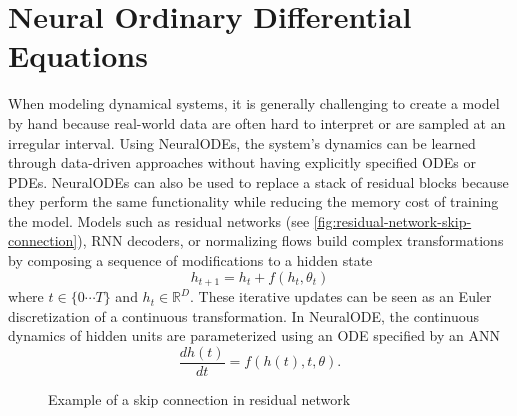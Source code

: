 \section{Neural Ordinary Differential Equations}
\label{sec:literature-review-neural-ordinary-differential-equations}

When modeling dynamical systems, it is generally challenging to create a model by hand because real-world data are often hard to interpret or are sampled at an irregular interval.
Using \glspl{NeuralODE}, the system's dynamics can be learned through data-driven approaches without having explicitly specified \glspl{ODE} or \glspl{PDE}.
\glspl{NeuralODE} can also be used to replace a stack of residual blocks because they perform the same functionality while reducing the memory cost of training the model.
Models such as residual networks (see \autoref{fig:residual-network-skip-connection}), \gls{RNN} decoders, or normalizing flows build complex transformations by composing a sequence of modifications to a hidden state \cite{chenNeuralOrdinaryDifferential2019}
\begin{equation*}
    h_{t+1} = h_t + f(h_t, \theta_t)
\end{equation*}
where $t \in \{0 \cdots T\}$ and $h_t \in \mathbb{R}^D$.
These iterative updates can be seen as an Euler discretization of a continuous transformation.
In \gls{NeuralODE}, the continuous dynamics of hidden units are parameterized using an \gls{ODE} specified by an \gls{ANN} \cite{chenNeuralOrdinaryDifferential2019}
\begin{equation*}
    \frac{dh(t)}{dt} = f(h(t), t, \theta).
\end{equation*}

\begin{figure}[h]
    \centering
    \caption{Example of a skip connection in residual network}
    \label{fig:residual-network-skip-connection}
\end{figure}

